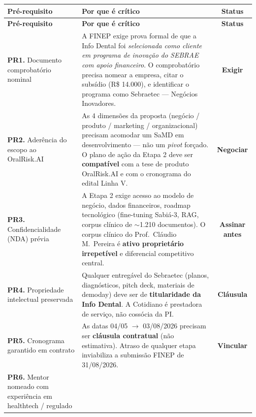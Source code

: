\documentclass[11pt, a4paper]{article}
\begin{document}
\renewcommand{\arraystretch}{1.3}
{\small
\begin{xltabular}{\textwidth}{@{} l X c @{}}
    \toprule
     \textbf{Pré-requisito} & \textbf{Por que é crítico} & \textbf{Status} \\
    \midrule
    \endfirsthead
    \toprule
     \textbf{Pré-requisito} & \textbf{Por que é crítico} & \textbf{Status} \\
    \midrule
    \endhead
    \bottomrule
    \endlastfoot
    \textbf{PR1.} Documento comprobatório nominal &
    A FINEP exige prova formal de que a Info Dental foi \emph{selecionada como cliente em programa de inovação do SEBRAE com apoio financeiro}. O comprobatório precisa nomear a empresa, citar o subsídio (R\$ 14.000), e identificar o programa como Sebraetec --- Negócios Inovadores. &
    \textcolor{accentColor}{\textbf{Exigir}} \\
    \textbf{PR2.} Aderência do escopo ao OralRisk.AI &
    As 4 dimensões da proposta (negócio / produto / marketing / organizacional) precisam acomodar um SaMD em desenvolvimento --- não um \textit{pivot} forçado. O plano de ação da Etapa 2 deve ser \textbf{compatível} com a tese de produto OralRisk.AI e com o cronograma do edital Linha V. &
    \textcolor{accentColor}{\textbf{Negociar}} \\
    \textbf{PR3.} Confidencialidade (NDA) prévia &
    A Etapa 2 exige acesso ao modelo de negócio, dados financeiros, roadmap tecnológico (fine-tuning Sabiá-3, RAG, corpus clínico de $\sim$1.210 documentos). O corpus clínico do Prof.\ Cláudio M.\ Pereira é \textbf{ativo proprietário irrepetível} e diferencial competitivo central. &
    \textcolor{accentColor}{\textbf{Assinar antes}} \\
    \textbf{PR4.} Propriedade intelectual preservada &
    Qualquer entregável do Sebraetec (planos, diagnósticos, pitch deck, materiais de demoday) deve ser de \textbf{titularidade da Info Dental}. A Cotidiano é prestadora de serviço, não cossócia da PI. &
    \textcolor{accentColor}{\textbf{Cláusula}} \\
    \textbf{PR5.} Cronograma garantido em contrato &
    As datas 04/05 $\to$ 03/08/2026 precisam ser \textbf{cláusula contratual} (não estimativa). Atraso de qualquer etapa inviabiliza a submissão FINEP de 31/08/2026. &
    \textcolor{accentColor}{\textbf{Vincular}} \\
    \textbf{PR6.} Mentor nomeado com experiência em healthtech / regulado &

\end{xltabular}}
\end{document}
